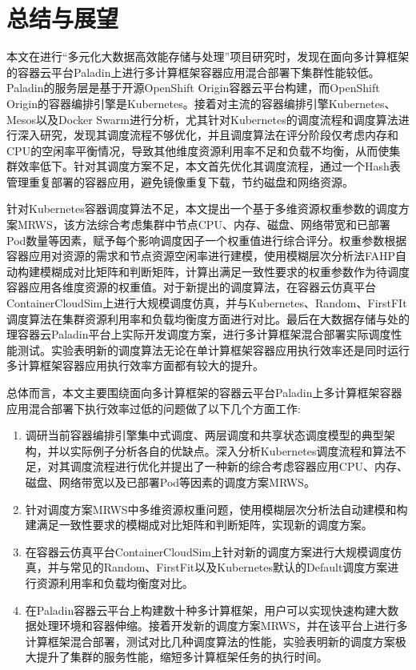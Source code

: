 \chapter{总结与展望}
本文在进行“多元化大数据高效能存储与处理”项目研究时，发现在面向多计算框架的容器云平台Paladin上进行多计算框架容器应用混合部署下集群性能较低。Paladin的服务层是基于开源OpenShift Origin容器云平台构建，而OpenShift Origin的容器编排引擎是Kubernetes。接着对主流的容器编排引擎Kubernetes、Mesos以及Docker Swarm进行分析，尤其针对Kubernetes的调度流程和调度算法进行深入研究，发现其调度流程不够优化，并且调度算法在评分阶段仅考虑内存和CPU的空闲率平衡情况，导致其他维度资源利用率不足和负载不均衡，从而使集群效率低下。针对其调度方案不足，本文首先优化其调度流程，通过一个Hash表管理重复部署的容器应用，避免镜像重复下载，节约磁盘和网络资源。

针对Kubernetes容器调度算法不足，本文提出一个基于多维资源权重参数的调度方案MRWS，该方法综合考虑集群中节点CPU、内存、磁盘、网络带宽和已部署Pod数量等因素，赋予每个影响调度因子一个权重值进行综合评分。权重参数根据容器应用对资源的需求和节点资源空闲率进行建模，使用模糊层次分析法FAHP自动构建模糊成对比矩阵和判断矩阵，计算出满足一致性要求的权重参数作为待调度容器应用各维度资源的权重值。对于新提出的调度算法，在容器云仿真平台ContainerCloudSim上进行大规模调度仿真，并与Kubernetes、Random、FirstFIt调度算法在集群资源利用率和负载均衡度方面进行对比。最后在大数据存储与处的理容器云Paladin平台上实际开发调度方案，进行多计算框架混合部署实际调度性能测试。实验表明新的调度算法无论在单计算框架容器应用执行效率还是同时运行多计算框架容器应用执行效率方面都有较大的提升。

总体而言，本文主要围绕面向多计算框架的容器云平台Paladin上多计算框架容器应用混合部署下执行效率过低的问题做了以下几个方面工作:
\begin{enumerate}[(1)]
	\item 调研当前容器编排引擎集中式调度、两层调度和共享状态调度模型的典型架构，并以实际例子分析各自的优缺点。深入分析Kubernetes调度流程和算法不足，对其调度流程进行优化并提出了一种新的综合考虑容器应用CPU、内存、磁盘、网络带宽以及已部署Pod等因素的调度方案MRWS。
	\item 针对调度方案MRWS中多维资源权重问题，使用模糊层次分析法自动建模和构建满足一致性要求的模糊成对比矩阵和判断矩阵，实现新的调度方案。
	\item 在容器云仿真平台ContainerCloudSim上针对新的调度方案进行大规模调度仿真，并与常见的Random、FirstFit以及Kubernetes默认的Default调度方案进行资源利用率和负载均衡度对比。
	\item 在Paladin容器云平台上构建数十种多计算框架，用户可以实现快速构建大数据处理环境和容器伸缩。接着开发新的调度方案MRWS，并在该平台上进行多计算框架混合部署，测试对比几种调度算法的性能，实验表明新的调度方案极大提升了集群的服务性能，缩短多计算框架任务的执行时间。
\end{enumerate}


